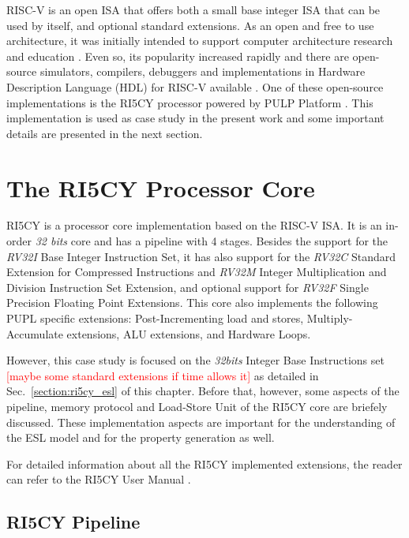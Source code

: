 RISC-V is an open ISA that offers both a small base integer ISA that can be used by itself, and optional standard extensions. As an open and free to use architecture, it was initially intended to support computer architecture research and education \cite{spec-riscv}. Even so, its popularity increased rapidly and there are open-source simulators, compilers, debuggers and implementations in Hardware Description Language (HDL) for RISC-V available \cite{book-comp-org}. One of these open-source implementations is the RI5CY processor powered by PULP Platform \cite{pulp}. This implementation is used as case study in the present work and some important details are presented in the next section. 

\section{The RI5CY Processor Core}
\label{section:ri5cy_core}

RI5CY is a processor core implementation based on the RISC-V ISA. It is an in-order \textit{32 bits} core and has a pipeline with 4 stages. Besides the support for the \textit{RV32I} Base Integer Instruction Set, it has also support for the \textit{RV32C} Standard Extension for Compressed Instructions and \textit{RV32M} Integer Multiplication and Division Instruction Set Extension, and optional support for \textit{RV32F} Single Precision Floating Point Extensions. This core also implements the following PUPL specific extensions:  Post-Incrementing load and stores, Multiply-Accumulate extensions, ALU extensions, and Hardware Loops.

However, this case study is focused on the \textit{32bits} Integer Base Instructions set \textcolor{red}{[maybe some standard extensions if time allows it]} as detailed in Sec.~\ref{section:ri5cy_esl} of this chapter. Before that, however, some aspects of the pipeline, memory protocol and Load-Store Unit of the RI5CY core are briefely discussed. These implementation aspects are important for the understanding of the ESL model and for the property generation as well.

For detailed information about all the RI5CY implemented extensions, the reader can refer to the RI5CY User Manual \cite{manual-ri5cy}.

\subsection*{RI5CY Pipeline}

